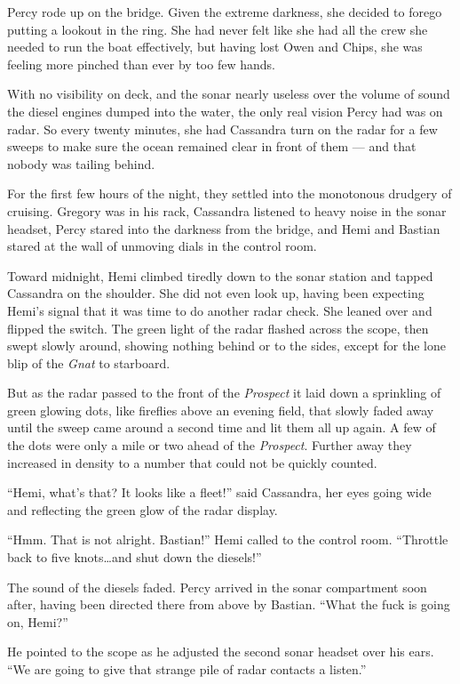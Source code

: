 \documentclass[
]{scrbook}
\begin{document}
Percy rode up on the bridge. Given the extreme darkness, she decided to
forego putting a lookout in the ring. She had never felt like she had
all the crew she needed to run the boat effectively, but having lost
Owen and Chips, she was feeling more pinched than ever by too few hands.

With no visibility on deck, and the sonar nearly useless over the volume
of sound the diesel engines dumped into the water, the only real vision
Percy had was on radar. So every twenty minutes, she had Cassandra turn
on the radar for a few sweeps to make sure the ocean remained clear in
front of them --- and that nobody was tailing behind.

For the first few hours of the night, they settled into the monotonous
drudgery of cruising. Gregory was in his rack, Cassandra listened to
heavy noise in the sonar headset, Percy stared into the darkness from
the bridge, and Hemi and Bastian stared at the wall of unmoving dials in
the control room.

Toward midnight, Hemi climbed tiredly down to the sonar station and
tapped Cassandra on the shoulder. She did not even look up, having been
expecting Hemi's signal that it was time to do another radar check. She
leaned over and flipped the switch. The green light of the radar flashed
across the scope, then swept slowly around, showing nothing behind or to
the sides, except for the lone blip of the \emph{Gnat} to starboard.

But as the radar passed to the front of the \emph{Prospect} it laid down
a sprinkling of green glowing dots, like fireflies above an evening
field, that slowly faded away until the sweep came around a second time
and lit them all up again. A few of the dots were only a mile or two
ahead of the \emph{Prospect}. Further away they increased in density to
a number that could not be quickly counted.

``Hemi, what's that? It looks like a fleet!'' said Cassandra, her eyes
going wide and reflecting the green glow of the radar display.

``Hmm. That is not alright. Bastian!'' Hemi called to the control room.
``Throttle back to five knots\ldots and shut down the diesels!''

The sound of the diesels faded. Percy arrived in the sonar compartment
soon after, having been directed there from above by Bastian. ``What the
fuck is going on, Hemi?''

He pointed to the scope as he adjusted the second sonar headset over his
ears. ``We are going to give that strange pile of radar contacts a
listen.''
\end{document}
